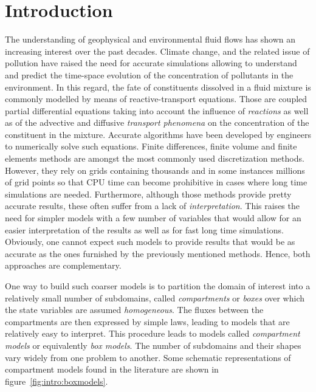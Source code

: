 \chapter*{Introduction}
The understanding of geophysical and environmental fluid flows has shown an increasing interest over the past decades. Climate change, and the related issue of pollution have raised the need for accurate simulations allowing to understand and predict the time-space evolution of the concentration of pollutants in the environment. In this regard, the fate of constituents dissolved in a fluid mixture is commonly modelled by means of reactive-transport equations. Those are coupled partial differential equations taking into account the influence of \textit{reactions} as well as of the advective and diffusive \textit{transport phenomena} on the concentration of the constituent in the mixture. Accurate algorithms have been developed by engineers to numerically solve such equations. Finite differences, finite volume and finite elements methods are amongst the most commonly used discretization methods. However, they rely on grids containing thousands and in some instances millions of grid points so that CPU time can become prohibitive in cases where long time simulations are needed. Furthermore, although those methods provide pretty accurate results, these often suffer from a lack of \textit{interpretation}. This raises the need for simpler models with a few number of variables that would allow for an easier interpretation of the results as well as for fast long time simulations. Obviously, one cannot expect such models to provide results that would be as accurate as the ones furnished by the previously mentioned methods. Hence, both approaches are complementary. 

One way to build such coarser models is to partition the domain of interest into a relatively small number of subdomains, called \textit{compartments} or \textit{boxes} over which the state variables are assumed \textit{homogeneous}. The fluxes between the compartments are then expressed by simple laws, leading to models that are relatively easy to interpret. This procedure leads to models called \textit{compartment models} or equivalently \textit{box models}. The number of subdomains and their shapes vary widely from one problem to another. Some schematic representations of compartment models found in the literature are shown in figure~\ref{fig:intro:boxmodels}.

